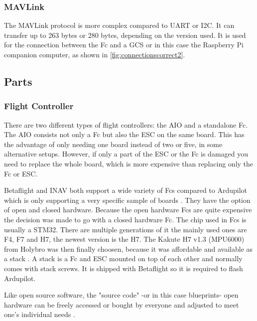 \documentclass[svgnames]{article}
\begin{document}
	\subsubsection{MAVLink}
	The MAVLink protocol is more complex compared to \gls{UART} or \gls{I2C}. It can transfer up to 263 bytes or 280 bytes, depending on the version used. It is used for the connection between the \gls{Fc} and a \gls{GCS} or in this case the Raspberry Pi companion computer, as shown in \cref{fig:connectionscorrect2}.
	\subsection{Parts}
	
	\subsubsection[Fc]{Flight Controller}
	There are two different types of flight controllers: the \gls{AIO} and a standalone \gls{Fc}. The \gls{AIO} consists not only a \gls{Fc} but also the \gls{ESC} on the same board. This has the advantage of only needing one board instead of two or five, in some alternative setups. However, if only a part of the \gls{ESC} or the \gls{Fc} is damaged you need to replace the whole board, which is more expensive than replacing only the \gls{Fc} or \gls{ESC}. 
	
	Betaflight and \gls{INAV} both support a wide variety of \glspl{Fc} compared to Ardupilot which is only supporting a very specific sample of boards \cite{FcSupport}. They have the option of open and closed hardware. Because the open hardware \glspl{Fc} are quite expensive the decision was made to go with a closed hardware \gls{Fc}. The chip used in \glspl{Fc} is usually a STM32. There are multiple generations of it the mainly used ones are F4, F7 and H7, the newest version is the H7. The Kakute H7 v1.3 (MPU6000) from Holybro was then finally choosen, because it was affordable and available as a stack \cite{KakuteH7}. A stack is a \gls{Fc} and \gls{ESC} mounted on top of each other and normally comes with stack screws. It is shipped with Betaflight so it is required to flash Ardupilot. 
	\begin{Explanation}
		\item Like open source software, the "source code" -or in this case blueprints- open hardware can be freely accessed or bought by everyone and adjusted to meet one's individual needs \cite{openhardware}.
	\end{Explanation}
\end{document}
